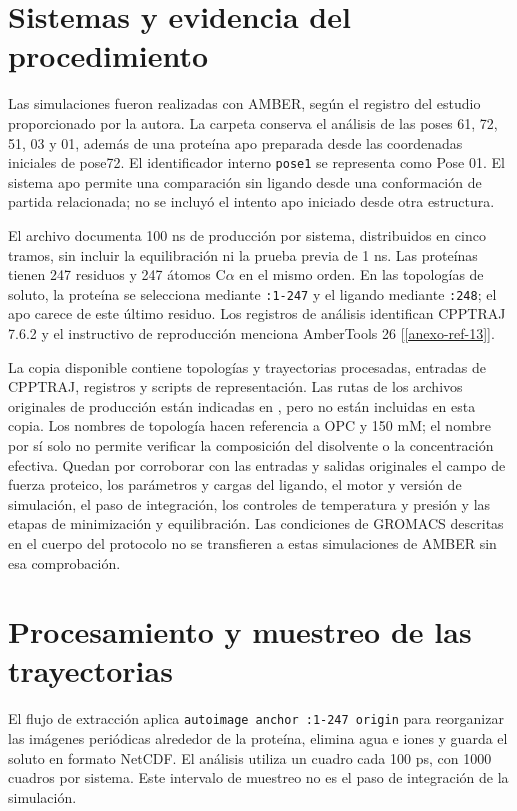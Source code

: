 \documentclass[12 pt, letter, oneside]{book}
\begin{document}
\section{Sistemas y evidencia del procedimiento}
Las simulaciones fueron realizadas con AMBER, según el registro del estudio proporcionado por la autora. La carpeta  conserva el análisis de las poses 61, 72, 51, 03 y 01, además de una proteína apo preparada desde las coordenadas iniciales de pose72. El identificador interno \texttt{pose1} se representa como Pose 01. El sistema apo permite una comparación sin ligando desde una conformación de partida relacionada; no se incluyó el intento apo iniciado desde otra estructura.

El archivo  documenta 100 ns de producción por sistema, distribuidos en cinco tramos, sin incluir la equilibración ni la prueba previa de 1 ns. Las proteínas tienen 247 residuos y 247 átomos C$\alpha$ en el mismo orden. En las topologías de soluto, la proteína se selecciona mediante \texttt{:1-247} y el ligando mediante \texttt{:248}; el apo carece de este último residuo. Los registros de análisis identifican CPPTRAJ 7.6.2 y el instructivo de reproducción menciona AmberTools 26 [\ref{anexo-ref-13}].

La copia disponible contiene topologías y trayectorias procesadas, entradas de CPPTRAJ, registros y scripts de representación. Las rutas de los archivos originales de producción están indicadas en , pero no están incluidas en esta copia. Los nombres de topología hacen referencia a OPC y 150 mM; el nombre por sí solo no permite verificar la composición del disolvente o la concentración efectiva. Quedan por corroborar con las entradas y salidas originales el campo de fuerza proteico, los parámetros y cargas del ligando, el motor y versión de simulación, el paso de integración, los controles de temperatura y presión y las etapas de minimización y equilibración. Las condiciones de GROMACS descritas en el cuerpo del protocolo no se transfieren a estas simulaciones de AMBER sin esa comprobación.

\section{Procesamiento y muestreo de las trayectorias}
El flujo de extracción aplica \texttt{autoimage anchor :1-247 origin} para reorganizar las imágenes periódicas alrededor de la proteína, elimina agua e iones y guarda el soluto en formato NetCDF. El análisis utiliza un cuadro cada 100 ps, con 1000 cuadros por sistema. Este intervalo de muestreo no es el paso de integración de la simulación.
\end{document}
